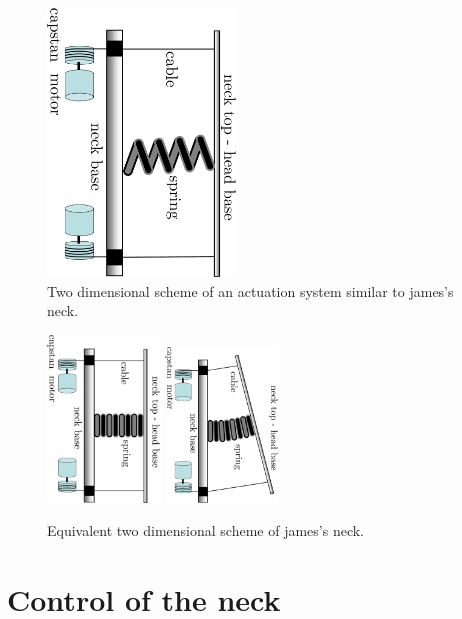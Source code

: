 \documentclass[conference]{IEEEtran}
\numberwithin{equation}{section}
\begin{document}
\begin{figure}[tbp]
\centering
\includegraphics[width=50mm, angle=90]{image/Neck2DSpring.pdf} 
\caption{Two dimensional scheme of an actuation system similar to james's neck.}
\label{Fig:HeadAct2D}
\end{figure}

\begin{figure}[tbp]
\centering
\includegraphics[width=30mm, angle=90]{image/Neck2DSpringCompressed.pdf} 
\includegraphics[width=30mm, angle=90]{image/Neck2DSpringCompressedBent.pdf} 
\caption{Equivalent two dimensional scheme of james's neck.}
\label{Fig:HeadAct2DSpring}
\end{figure}


\section{Control of the neck} \label{Sec:NeckControl}
\end{document}
